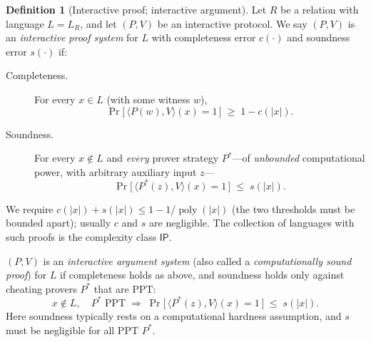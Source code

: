\documentclass[11pt,a4paper]{article}
\theoremstyle{definition}
\newtheorem{definition}[theorem]{Definition}
\theoremstyle{remark}
\DeclareMathOperator{\poly}{poly}
\begin{document}
\begin{definition}[Interactive proof; interactive argument]\label{zk:def:proofargument}
Let \(R\) be a relation with language \(L = L_R\), and let \((P,V)\) be an interactive protocol. We say \((P,V)\) is an \emph{interactive proof system} for \(L\) with completeness error \(c(\cdot)\) and soundness error \(s(\cdot)\) if:
\begin{description}
  \item[Completeness.] For every \(x \in L\) (with some witness \(w\)),
    \[
      \Pr\!\big[\, \langle P(w), V\rangle(x) = 1 \,\big] \;\ge\; 1 - c(|x|).
    \]
  \item[Soundness.] For every \(x \notin L\) and \emph{every} prover strategy \(P^*\)---of \emph{unbounded} computational power, with arbitrary auxiliary input \(z\)---
    \[
      \Pr\!\big[\, \langle P^*(z), V\rangle(x) = 1 \,\big] \;\le\; s(|x|).
    \]
\end{description}
We require \(c(|x|) + s(|x|) \le 1 - 1/\poly(|x|)\) (the two thresholds must be bounded apart); usually \(c\) and \(s\) are negligible. The collection of languages with such proofs is the complexity class \(\textsf{IP}\).

\((P,V)\) is an \emph{interactive argument system} (also called a \emph{computationally sound proof}) for \(L\) if completeness holds as above, and soundness holds only against cheating provers \(P^*\) that are PPT:
\[
  x \notin L,\quad P^* \text{ PPT} \;\Longrightarrow\; \Pr\!\big[\, \langle P^*(z), V\rangle(x) = 1 \,\big] \;\le\; s(|x|).
\]
Here soundness typically rests on a computational hardness assumption, and \(s\) must be negligible for all PPT \(P^*\).
\end{definition}
\end{document}
